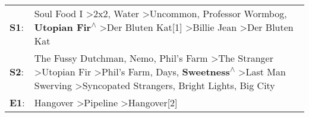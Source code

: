 \begin{supertabular}{p{0.03\textwidth}p{0.92\textwidth}}
 \textbf{S1}:  &                                                                                                          Soul Food I\textsuperscript{} \textgreater \enspace 2x2\textsuperscript{}, \enspace Water\textsuperscript{} \textgreater \enspace Uncommon\textsuperscript{}, \enspace Professor Wormbog\textsuperscript{}, \enspace \textbf{Utopian Fir\textsuperscript{$\wedge$}} \textgreater \enspace Der Bluten Kat[1]\textsuperscript{} \textgreater \enspace Billie Jean\textsuperscript{} \textgreater \enspace Der Bluten Kat\textsuperscript{}  \enspace  \\
 \textbf{S2}:  &  The Fussy Dutchman\textsuperscript{}, \enspace Nemo\textsuperscript{}, \enspace Phil's Farm\textsuperscript{} \textgreater \enspace The Stranger\textsuperscript{} \textgreater \enspace Utopian Fir\textsuperscript{} \textgreater \enspace Phil's Farm\textsuperscript{},  Days\textsuperscript{}, \enspace \textbf{Sweetness\textsuperscript{$\wedge$}} \textgreater \enspace Last Man Swerving\textsuperscript{} \textgreater \enspace Syncopated Strangers\textsuperscript{}, \enspace Bright Lights, Big City\textsuperscript{}  \enspace  \\
 \textbf{E1}:  &                                                                                                                                                                                                                                                                                                                                                                                                                   Hangover\textsuperscript{} \textgreater \enspace Pipeline\textsuperscript{} \textgreater \enspace Hangover[2]\textsuperscript{}  \enspace  \\
\end{supertabular}
